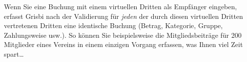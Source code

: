 Wenn Sie eine Buchung mit einem virtuellen Dritten als Empfänger eingeben, erfasst Grisbi nach der Validierung für \emph{jeden} der durch diesen virtuellen Dritten vertretenen Dritten eine identische Buchung (Betrag, Kategorie, Gruppe, Zahlungsweise usw.). So können Sie beispielsweise die Mitgliedsbeiträge für 200 Mitglieder eines Vereins in einem einzigen Vorgang erfassen, was Ihnen viel Zeit spart\ldots

